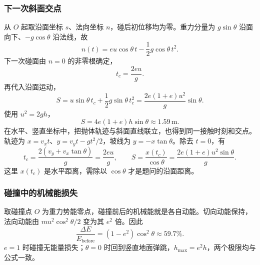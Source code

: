 \documentclass[UTF8,fontset=fandol,a4paper,11pt]{ctexart}
\begin{document}
\subsubsection*{下一次斜面交点}
从 $O$ 起取沿面坐标 $s$、法向坐标 $n$，碰后初位移均为零。重力分量为 $g\sin\theta$ 沿面向下、$-g\cos\theta$ 沿法线，故
\[
n(t)=eu\cos\theta\,t-\frac12g\cos\theta\,t^2.
\]
下一次碰面由 $n=0$ 的非零根确定，
\[
t_c=\frac{2eu}{g}.
\]
再代入沿面运动，
\[
S=u\sin\theta\,t_c+\frac12g\sin\theta\,t_c^2
=\frac{2e(1+e)u^2}{g}\sin\theta.
\]
使用 $u^2=2gh$，
\[
\boxed{S=4e(1+e)h\sin\theta\approx1.59\,\mathrm m}.
\]
在水平、竖直坐标中，把抛体轨迹与斜面直线联立，也得到同一接触时刻和交点。轨迹为 $x=v_xt$、$y=v_yt-gt^2/2$，坡线为 $y=-x\tan\theta$。除去 $t=0$，有
\[
t_c=\frac{2(v_y+v_x\tan\theta)}g
=\frac{2eu}g,\qquad
S=\frac{x(t_c)}{\cos\theta}
=\frac{2e(1+e)u^2\sin\theta}g.
\]
这里 $x(t_c)$ 是水平距离，需除以 $\cos\theta$ 才是题问的沿面距离。

\subsubsection*{碰撞中的机械能损失}
取碰撞点 $O$ 为重力势能零点，碰撞前后的机械能就是各自动能。切向动能保持，法向动能由
$mu^2\cos^2\theta/2$ 变为其 $e^2$ 倍。因此
\[
\boxed{\frac{\Delta E}{E_{\mathrm{before}}}
=(1-e^2)\cos^2\theta\approx59.7\%}.
\]
$e=1$ 时碰撞无能量损失；$\theta=0$ 时回到竖直地面弹跳，$h_{\max}=e^2h$，两个极限均与公式一致。
\end{document}
